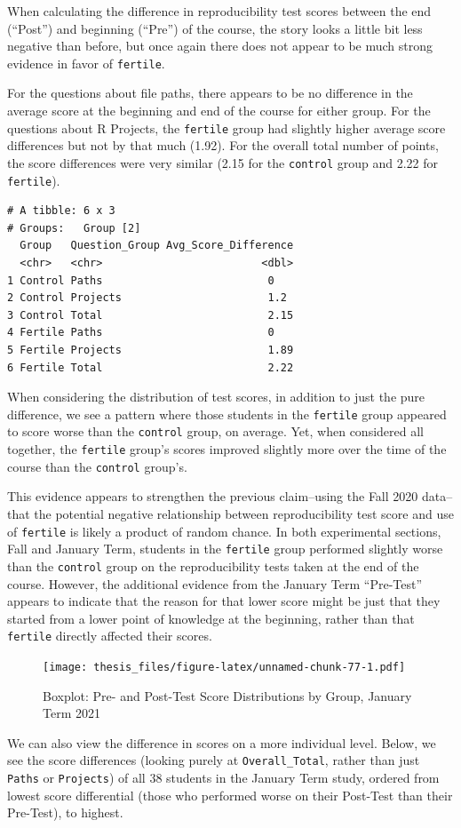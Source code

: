 \documentclass[12pt,twoside]{reedthesis}
\begin{document}
When calculating the difference in reproducibility test scores between the end (``Post'') and beginning (``Pre'') of the course, the story looks a little bit less negative than before, but once again there does not appear to be much strong evidence in favor of \texttt{fertile}.

For the questions about file paths, there appears to be no difference in the average score at the beginning and end of the course for either group. For the questions about R Projects, the \texttt{fertile} group had slightly higher average score differences but not by that much (1.92). For the overall total number of points, the score differences were very similar (2.15 for the \texttt{control} group and 2.22 for \texttt{fertile}).
\begin{verbatim}
# A tibble: 6 x 3
# Groups:   Group [2]
  Group   Question_Group Avg_Score_Difference
  <chr>   <chr>                         <dbl>
1 Control Paths                          0   
2 Control Projects                       1.2 
3 Control Total                          2.15
4 Fertile Paths                          0   
5 Fertile Projects                       1.89
6 Fertile Total                          2.22
\end{verbatim}
When considering the distribution of test scores, in addition to just the pure difference, we see a pattern where those students in the \texttt{fertile} group appeared to score worse than the \texttt{control} group, on average. Yet, when considered all together, the \texttt{fertile} group's scores improved slightly more over the time of the course than the \texttt{control} group's.

This evidence appears to strengthen the previous claim--using the Fall 2020 data--that the potential negative relationship between reproducibility test score and use of \texttt{fertile} is likely a product of random chance. In both experimental sections, Fall and January Term, students in the \texttt{fertile} group performed slightly worse than the \texttt{control} group on the reproducibility tests taken at the end of the course. However, the additional evidence from the January Term ``Pre-Test'' appears to indicate that the reason for that lower score might be just that they started from a lower point of knowledge at the beginning, rather than that \texttt{fertile} directly affected their scores.
\begin{figure}
\centering
\texttt{[image: thesis\_files/figure-latex/unnamed-chunk-77-1.pdf]}
\caption{\label{fig:unnamed-chunk-77}Boxplot: Pre- and Post-Test Score Distributions by Group, January Term 2021}
\end{figure}
We can also view the difference in scores on a more individual level. Below, we see the score differences (looking purely at \texttt{Overall\_Total}, rather than just \texttt{Paths} or \texttt{Projects}) of all 38 students in the January Term study, ordered from lowest score differential (those who performed worse on their Post-Test than their Pre-Test), to highest.
\end{document}
